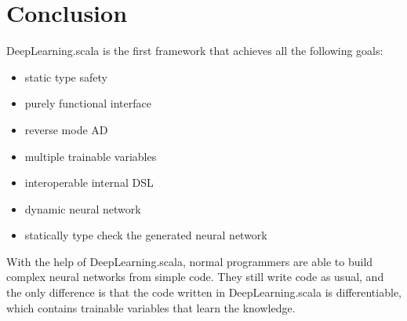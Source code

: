 \section{Conclusion}

DeepLearning.scala is the first framework that achieves all the following goals:

\begin{itemize}
  \item static type safety
  \item purely functional interface
  \item reverse mode AD
  \item multiple \glspl{trainable variable}
  \item interoperable internal DSL
  \item dynamic neural network
  \item statically type check the generated neural network
\end{itemize}

With the help of DeepLearning.scala, normal programmers are able to build complex neural networks from simple code. They still write code as usual, and the only difference is that the code written in DeepLearning.scala is differentiable, which contains \glspl{trainable variable} that learn the knowledge.

\clearpage
\appendix

\printglossary

\begin{acks}
\end{acks}


